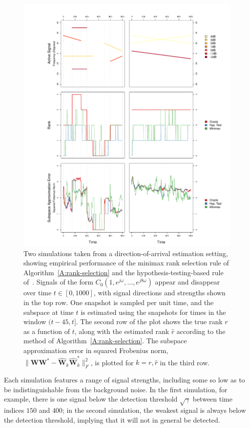 \documentclass[final]{IEEEtran}
\newcommand{\matrixsymbol}{\boldsymbol}
\newcommand{\mW}{\matrixsymbol{W}}
\newcommand{\mhW}{\widehat{\matrixsymbol{W}}}
\begin{document}
\begin{figure}
    \includegraphics[width=2.1\columnwidth]{plots/doa-sim}
    \caption{\label{F:simulations} Two simulations taken from a direction-of-arrival estimation setting, showing empirical performance of the minimax rank selection rule of Algorithm~\ref{A:rank-selection} and the hypothesis-testing-based rule of~\cite{kritchman2008dnc}.  Signals of the form $C_0 ( 1, e^{j \omega}, \ldots, e^{j 8 \omega})$ appear and disappear over time $t \in [0,1000]$, with signal directions and strengths shown in the top row.  One snapshot is sampled per unit time, and the subspace at time $t$ is estimated using the snapshots for times in the window $(t-45,t]$.  The second row of the plot shows the true rank $r$ as a function of $t$, along with the estimated rank $\hat r$ according to the method of Algorithm~\ref{A:rank-selection}.  The subspace approximation error in squared Frobenius norm, $\|\mW \mW^\ast - \mhW_k \mhW^\ast_k \|_F^2$, is plotted for $k = r, \hat r$ in the third row.}
\end{figure}

Each simulation features a range of signal strengths, including some so low as to be indistinguishable from the background noise.  In the first simulation, for example, there is one signal below the detection threshold $\sqrt{\gamma}$ between time indices $150$ and $400$; in the second simulation, the weakest signal is always below the detection threshold, implying that it will not in general be detected.
\end{document}
